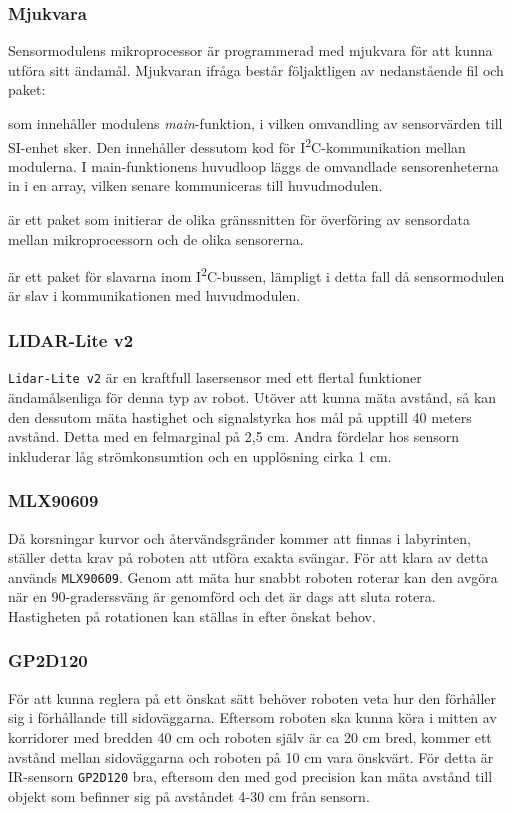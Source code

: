 \documentclass[11pt]{article}
\begin{document}
\begin{flushleft}
\subsubsection{Mjukvara}
Sensormodulens mikroprocessor är programmerad med mjukvara för att kunna utföra sitt ändamål. Mjukvaran ifråga består följaktligen av nedanstående fil och paket: 

\begin{description}[style=unboxed, leftmargin=0cm]
  \item[sensorModule.c] som innehåller modulens \textit{main}-funktion, i vilken omvandling av sensorvärden till SI-enhet sker. Den innehåller dessutom kod för I\textsuperscript{2}C-kommunikation mellan modulerna. I main-funktionens huvudloop läggs de omvandlade sensorenheterna in i en array, vilken senare kommuniceras till huvudmodulen.
  \item[sensorInit.h] är ett paket som initierar de olika gränssnitten för överföring av sensordata mellan mikroprocessorn och de olika sensorerna.
  \item[I2C\_slave.h] är ett paket för slavarna inom I\textsuperscript{2}C-bussen, lämpligt i detta fall då sensormodulen är slav i kommunikationen med huvudmodulen.
\end{description}

\subsubsection{LIDAR-Lite v2}
\verb+Lidar-Lite v2+ är en kraftfull lasersensor med ett flertal funktioner ändamålsenliga för denna typ av robot. Utöver att kunna mäta avstånd, så kan den dessutom mäta hastighet och signalstyrka hos mål på upptill 40 meters avstånd. Detta med en felmarginal på 2,5 cm. Andra fördelar hos sensorn inkluderar låg strömkonsumtion och en upplösning cirka 1 cm.

\subsubsection{MLX90609}
Då korsningar kurvor och återvändsgränder kommer att finnas i labyrinten, ställer detta krav på roboten att utföra exakta svängar. För att klara av detta används \verb+MLX90609+. Genom att mäta hur snabbt roboten roterar kan den avgöra när en 90-graderssväng är genomförd och det är dags att sluta rotera. Hastigheten på rotationen kan ställas in efter önskat behov.

\subsubsection{GP2D120}
För att kunna reglera på ett önskat sätt behöver roboten veta hur den förhåller sig i förhållande till sidoväggarna. Eftersom roboten ska kunna köra i mitten av korridorer med bredden 40 cm och roboten själv är ca 20 cm bred, kommer ett avstånd mellan sidoväggarna och roboten på 10 cm vara önskvärt. För detta är IR-sensorn \verb+GP2D120+ bra, eftersom den med god precision kan mäta avstånd till objekt som befinner sig på avståndet 4-30 cm från sensorn. 


\end{flushleft}
\end{document}
